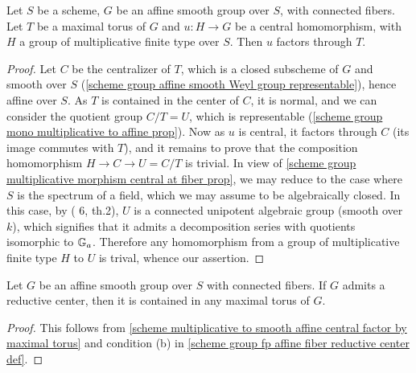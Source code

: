 \begin{lemma}\label{scheme multiplicative to smooth affine central factor by maximal torus}
Let $S$ be a scheme, $G$ be an affine smooth group over $S$, with connected fibers. Let $T$ be a maximal torus of $G$ and $u:H\to G$ be a central homomorphism, with $H$ a group of multiplicative finite type over $S$. Then $u$ factors through $T$.
\end{lemma}
\begin{proof}
Let $C$ be the centralizer of $T$, which is a closed subscheme of $G$ and smooth over $S$ (\cref{scheme group affine smooth Weyl group representable}), hence affine over $S$. As $T$ is contained in the center of $C$, it is normal, and we can consider the quotient group $C/T=U$, which is representable (\cref{scheme group mono multiplicative to affine prop}). Now as $u$ is central, it factors through $C$ (its image commutes with $T$), and it remains to prove that the composition homomorphism $H\to C\to U=C/T$ is trivial. In view of \cref{scheme group multiplicative morphism central at fiber prop}, we may reduce to the case where $S$ is the spectrum of a field, which we may assume to be algebraically closed. In this case, by (\cite{Chevalley1958} 6, th.2), $U$ is a connected unipotent algebraic group (smooth over $k$), which signifies that it admits a decomposition series with quotients isomorphic to $\mathbb{G}_a$. Therefore any homomorphism from a group of multiplicative finite type $H$ to $U$ is trival, whence our assertion. 
\end{proof}

\begin{corollary}\label{scheme smooth affine reductive center in any maximal torus}
Let $G$ be an affine smooth group over $S$ with connected fibers. If $G$ admits a reductive center, then it is contained in any maximal torus of $G$.
\end{corollary}
\begin{proof}
This follows from \cref{scheme multiplicative to smooth affine central factor by maximal torus} and condition (b) in \cref{scheme group fp affine fiber reductive center def}.
\end{proof}

